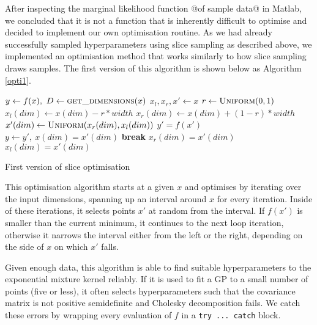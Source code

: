 \documentclass[a4paper,12pt,twoside,openright]{report}
\newcommand{\Break}{\State \textbf{break} }
\begin{document}
After inspecting the marginal likelihood function @of sample data@ in Matlab, we concluded that it is not a function that is inherently difficult to optimise and decided to implement our own optimisation routine. As we had already successfully sampled hyperparameters using slice sampling as described above, we implemented an optimisation method that works similarly to how slice sampling draws samples. The first version of this algorithm is shown below as Algorithm \ref{opti1}.


\begin{algorithm}
\begin{algorithmic}[1]
\State $y\gets f(x),\ D\gets \Call{get\_dimensions}{x}$
\State $x_l, x_r, x'\gets x$
\State $r\gets \Call{Uniform}{0, 1}$
\State $x_l(dim)\gets x(dim) - r * width$
\State $x_r(dim)\gets x(dim) + (1 - r) * width$
\State $x'(dim)\gets \Call{Uniform}{x_r(dim), x_l(dim)}$
\State $y' = f(x')$
\State $y\gets y',\ x(dim) = x'(dim)$
\Break
\EndIf
{}
\State $x_r(dim) = x'(dim)$
\State $x_l(dim) = x'(dim)$
\EndIf
\EndFor
\EndFor
\EndFor
\EndProcedure
\end{algorithmic}
\caption{First version of slice optimisation}
\label{opti1}
\end{algorithm}

This optimisation algorithm starts at a given $x$ and optimises by iterating over the input dimensions, spanning up an interval around $x$ for every iteration. Inside of these iterations, it selects points $x'$ at random from the interval. If $f(x')$ is smaller than the current minimum, it continues to the next loop iteration, otherwise it narrows the interval either from the left or the right, depending on the side of $x$ on which $x'$ falls.

Given enough data, this algorithm is able to find suitable hyperparameters to the exponential mixture kernel reliably. If it is used to fit a GP to a small number of points (five or less), it often selects hyperparameters such that the covariance matrix is not positive semidefinite and Cholesky decomposition fails. We catch these errors by wrapping every evaluation of $f$ in a \texttt{try ... catch} block. 
\end{document}
